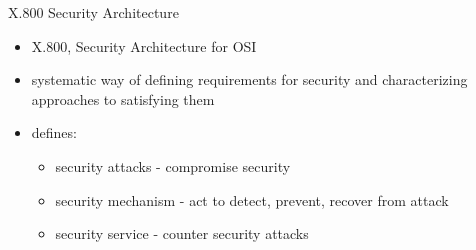 \documentclass{beamer}
\begin{document}
\begin{frame}{X.800 Security Architecture}
  \begin{itemize}
    \item X.800, Security Architecture for OSI 
    \item systematic way of defining requirements for 
    security and characterizing approaches to 
    satisfying them 
    \item defines: 
      \begin{itemize}
        \item security attacks - compromise security 
        \item security mechanism - act to detect, prevent, 
        recover from attack 
        \item security service - counter security attacks 
      \end{itemize}
  \end{itemize}
\end{frame}
\end{document}
